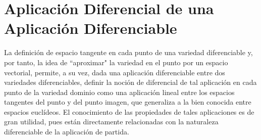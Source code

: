 \documentclass[cursovd_portada.tex]{subfiles}
\begin{document}
\chapter{Aplicación Diferencial de una\\ Aplicación
Diferenciable}
 \hs La definición de espacio tangente en cada
punto de una variedad diferenciable y, por tanto, la idea de
``aproximar" la variedad en el punto por un espacio vectorial,
permite, a su vez, dada una aplicación diferenciable entre dos
variedades diferenciables, definir la noción de diferencial de
tal aplicación en cada punto de la variedad dominio como una
aplicación lineal entre los espacios tangentes del punto y del
punto imagen, que generaliza a la bien conocida entre espacios
euclídeos. El conocimiento de las propiedades de tales
aplicaciones es de gran utilidad, pues están directamente
relacionadas con la naturaleza diferenciable de la aplicación
de partida.
\end{document}
